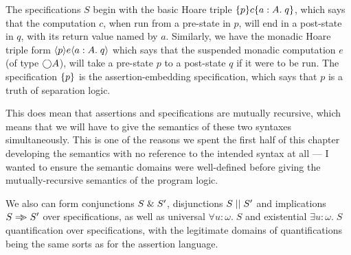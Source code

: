 The specifications $S$ begin with the basic Hoare triple
$\{{p}\}{c}\{{a:A}.\;{q}\}$, which says that the computation $c$, when run
from a pre-state in $p$, will end in a post-state in $q$, with its
return value named by $a$. Similarly, we have the monadic Hoare triple
form $\langle{p}\rangle{e}\langle{a:A}.\;{q}\rangle$ which says that the suspended monadic
computation $e$ (of type $\bigcirc{A}$), will take a pre-state $p$ to a
post-state $q$ if it were to be run. The specification $\{{p}\}$ is
the assertion-embedding specification, which says that $p$ is a truth
of separation logic.

This does mean that assertions and specifications are mutually
recursive, which means that we will have to give the semantics of
these two syntaxes simultaneously. This is one of the reasons we spent
the first half of this chapter developing the semantics with no
reference to the intended syntax at all --- I wanted to ensure the
semantic domains were well-defined before giving the
mutually-recursive semantics of the program logic.

We also can form conjunctions $S \;\&\; S'$, disjunctions $S \;||\; S'$
and implications $S \Rightarrow\!\!\!> S'$ over specifications, as well as universal
$\forall u:\omega.\;S$ and existential $\exists u:\omega.\;S$ quantification
over specifications, with the legitimate domains of quantifications being
the same sorts as for the assertion language. 


